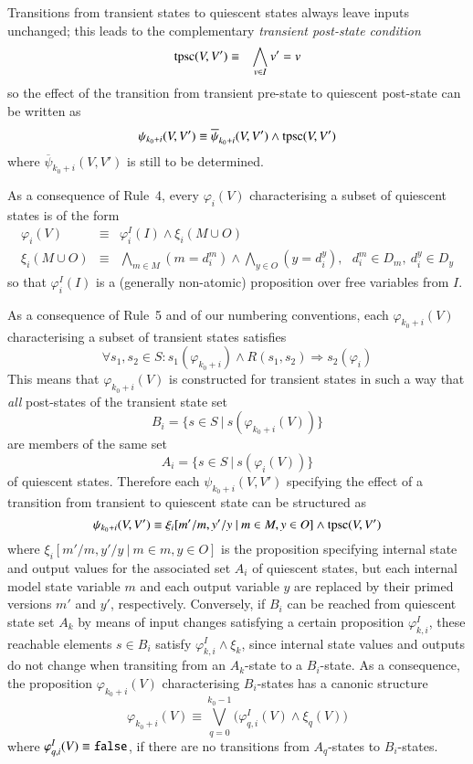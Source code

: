 Transitions from transient states to quiescent states always leave inputs unchanged; this leads to the complementary {\it transient post-state condition}
\begin{eqnarray*}
\text{tpsc}(V,V') & \equiv  & \bigwedge_{v\in I} v' = v
\end{eqnarray*}
so the effect of the transition from transient pre-state to quiescent post-state can be written
as 
$$
  \psi_{k_0+i}(V,V') \equiv  \overline{\psi}_{k_0+i}(V,V') \wedge \text{tpsc}(V,V')
$$
where $\overline{\psi}_{k_0+i}(V,V')$ is still to be determined.


As a consequence of Rule~4, every $\varphi_i(V)$ characterising a subset of quiescent states is of the form
\begin{eqnarray}\label{eq:phiquiescent}
\varphi_i(V) & \equiv & \varphi_i^I(I) \wedge \xi_i(M\cup O)
\\
 \xi_i(M\cup O) & \equiv &  \bigwedge_{m\in M} (m = d_i^m) \wedge 
\bigwedge_{y\in O}(y = d_i^y), \ \ \ d_i^m\in D_m,\ d_i^y\in D_y
\end{eqnarray}
so that $\varphi_i^I(I)$ is a (generally non-atomic) proposition over free variables from $I$. 

As a consequence of Rule~5 and of our numbering conventions, each $\varphi_{k_0+i}(V)$ characterising a subset of transient states satisfies
$$
\forall s_1,s_2\in S: s_1(\varphi_{k_0+i}) \wedge R(s_1,s_2) \Rightarrow s_2(\varphi_i)
$$ 
This means that  $\varphi_{k_0+i}(V)$ is constructed for transient states in such a way that {\it all} post-states of the transient state set 
$$
B_i = \{s\in S~|~s(\varphi_{k_0+i}(V))\}
$$ 
are members
of the same set 
$$
A_i = \{s\in S~|~s(\varphi_i(V))\}
$$ 
of quiescent states.
Therefore each $\psi_{k_0+i}(V,V')$ specifying the effect of a transition from transient to quiescent state can be structured as 
$$
\psi_{k_0+i}(V,V') \equiv   \xi_i[m'/m,y'/y~|~m\in M, y\in O]  \wedge\text{tpsc}(V,V')
$$
where $\xi_i[m'/m,y'/y~|~m\in m, y\in O]$ is the proposition specifying internal state and output values for the associated set $A_i$ of quiescent states, but each internal model state variable $m$ and each output variable $y$ are replaced by their primed versions $m'$ and $y'$, respectively. Conversely, if $B_i$ can be reached from quiescent state set $A_k$ by means of   input changes satisfying a certain proposition  $\varphi_{k,i}^I$,  these reachable elements $s\in B_i$ satisfy $\varphi_{k,i}^I \wedge \xi_k$, since internal state values and outputs do not change when transiting from an $A_k$-state to a $B_i$-state. As a consequence,   
the proposition $\varphi_{k_0+i}(V)$ characterising $B_i$-states has a canonic structure
\begin{equation}\label{eq:phitransient}
\varphi_{k_0+i}(V) \equiv \bigvee_{q=0}^{k_0-1} \big(\varphi_{q,i}^I(V) \wedge \xi_q(V)\big)
\end{equation}
where $\varphi_{q,i}^I(V) \equiv \mbox{{\tt false}}$, if there are no transitions from $A_q$-states to $B_i$-states.




